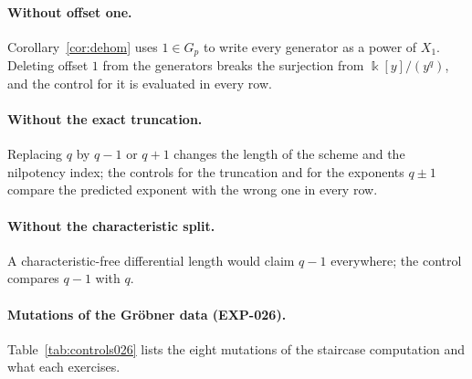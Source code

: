 \documentclass[11pt]{article}
\theoremstyle{definition}
\theoremstyle{remark}
\newcommand{\kfield}{\Bbbk}
\begin{document}
\paragraph{Without offset one.} Corollary~\ref{cor:dehom} uses $1\in G_p$ to write every generator as
a power of $X_1$. Deleting offset $1$ from the generators breaks the surjection from
$\kfield[y]/(y^q)$, and the control for it is evaluated in every row.

\paragraph{Without the exact truncation.} Replacing $q$ by $q-1$ or $q+1$ changes the length of the scheme and the
nilpotency index; the controls for the truncation and for the exponents $q\pm1$ compare the predicted
exponent with the wrong one in every row.

\paragraph{Without the characteristic split.} A characteristic-free differential length would claim
$q-1$ everywhere; the control compares $q-1$ with $q$.

\paragraph{Mutations of the Gr\"obner data (EXP-026).} Table~\ref{tab:controls026} lists the
eight mutations of the staircase computation and what each exercises.
\end{document}
